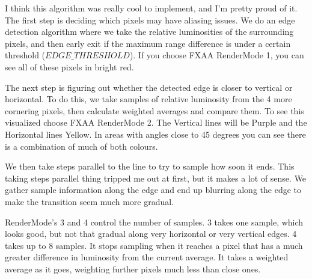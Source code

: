 \documentclass[10pt]{article}
\begin{document}
	I think this algorithm was really cool to implement, and I'm pretty proud of it. The first step is deciding which pixels may have aliasing issues. We do an edge detection algorithm where we take the relative luminosities of the surrounding pixels, and then early exit if the maximum range difference is under a certain threshold ($EDGE\_THRESHOLD$). If you choose FXAA RenderMode 1, you can see all of these pixels in bright red.
	
	The next step is figuring out whether the detected edge is closer to vertical or horizontal. To do this, we take samples of relative luminosity from the 4 more cornering pixels, then calculate weighted averages and compare them. To see this visualized choose FXAA RenderMode 2. The Vertical lines will be Purple and the Horizontal lines Yellow. In areas with angles close to 45 degrees you can see there is a combination of much of both colours.
	
	We then take steps parallel to the line to try to sample how soon it ends. This taking steps parallel thing tripped me out at first, but it makes a lot of sense. We gather sample information along the edge and end up blurring along the edge to make the transition seem much more gradual.
	
	RenderMode's 3 and 4 control the number of samples. 3 takes one sample, which looks good, but not that gradual along very horizontal or very vertical edges. 4 takes up to 8 samples. It stops sampling when it reaches a pixel that has a much greater difference in luminosity from the current average. It takes a weighted average as it goes, weighting further pixels much less than close ones.
\end{document}
